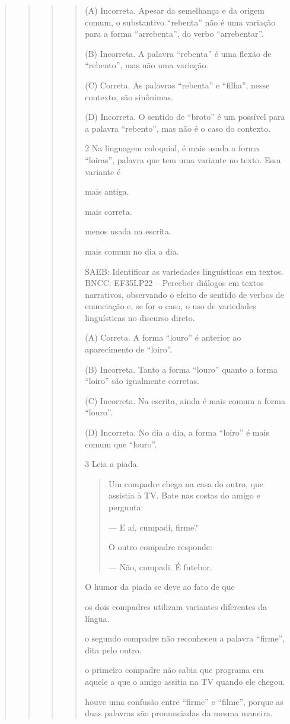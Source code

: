\begin{quote}
\begin{quote}
\begin{quote}
\begin{quote}
(A) Incorreta. Apesar da semelhança e da origem comum, o substantivo ``rebenta'' não é uma variação para a forma ``arrebenta'', do verbo ``arrebentar''.

(B) Incorreta. A palavra ``rebenta'' é uma flexão de ``rebento'', mas não uma variação.

(C) Correta. As palavras ``rebenta'' e ``filha'', nesse contexto, são sinônimas.

(D) Incorreta. O sentido de ``broto'' é um possível para a palavra ``rebento'', mas não é o caso do contexto.

\num{2} Na linguagem coloquial, é mais usada a forma ``loiras'', palavra que tem uma variante no texto. Essa variante é

\begin{escolha}
\item mais antiga.
\item mais correta.
\item menos usada na escrita.
\item mais comum no dia a dia.
\end{escolha}

SAEB: Identificar as variedades linguísticas em textos.
BNCC: EF35LP22 -- Perceber diálogos em textos narrativos, observando o
efeito de sentido de verbos de enunciação e, se for o caso, o uso de
variedades linguísticas no discurso direto.

(A) Correta. A forma ``louro'' é anterior ao aparecimento de ``loiro''.

(B) Incorreta. Tanto a forma ``louro'' quanto a forma ``loiro'' são igualmente corretas.

(C) Incorreta. Na escrita, ainda é mais comum a forma ``louro''.

(D) Incorreta. No dia a dia, a forma ``loiro'' é mais comum que ``louro''.

\num{3} Leia a piada.

\begin{quote}
Um compadre chega na casa do outro, que assistia à TV. Bate nas costas do amigo e pergunta:

--- E aí, cumpadi, firme?

O outro compadre responde:

--- Não, cumpadi. É futebor.

\end{quote}

O humor da piada se deve ao fato de que

\begin{escolha}
\item os dois compadres utilizam variantes diferentes da língua.
\item o segundo compadre não reconheceu a palavra ``firme'', dita pelo outro.
\item o primeiro compadre não sabia que programa era aquele a que o amigo assitia na TV quando ele chegou.
\item houve uma confusão entre ``firme'' e ``filme'', porque as duas palavras são pronunciadas da mesma maneira.
\end{escolha}


\end{quote}
\end{quote}
\end{quote}
\end{quote}
